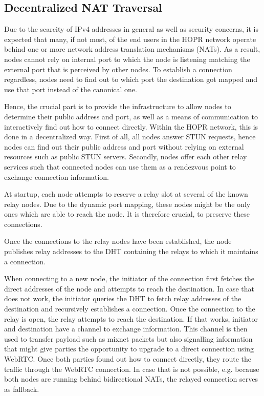 \subsection{Decentralized NAT Traversal}
\label{sec:p2p:nat-traversal}

Due to the scarcity of IPv4 addresses in general as well as security concerns, it is expected that many, if not most, of the end users in the HOPR network operate behind one or more network address translation mechanisms (NATs). As a result, nodes cannot rely on internal port to which the node is listening matching the external port that is perceived by other nodes. To establish a connection regardless, nodes need to find out to which port the destination got mapped and use that port instead of the canonical one.



Hence, the crucial part is to provide the infrastructure to allow nodes to determine their public address and port, as well as a means of communication to interactively find out how to connect directly. Within the HOPR network, this is done in a decentralized way. First of all, all nodes answer STUN requests, hence nodes can find out their public address and port without relying on external resources such as public STUN servers. Secondly, nodes offer each other relay services such that connected nodes can use them as a rendezvous point to exchange connection information.

At startup, each node attempts to reserve a relay slot at several of the known relay nodes. Due to the dynamic port mapping, these nodes might be the only ones which are able to reach the node. It is therefore crucial, to preserve these connections.

Once the connections to the relay nodes have been established, the node publishes relay addresses to the DHT containing the relays to which it maintains a connection.

When connecting to a new node, the initiator of the connection first fetches the direct addresses of the node and attempts to reach the destination. In case that does not work, the initiator queries the DHT to fetch relay addresses of the destination and recursively establishes a connection. Once the connection to the relay is open, the relay attempts to reach the destination. If that works, initiator and destination have a channel to exchange information. This channel is then used to transfer payload such as mixnet packets but also signalling information that might give parties the opportunity to upgrade to a direct connection using WebRTC. Once both parties found out how to connect directly, they route the traffic through the WebRTC connection. In case that is not possible, e.g. because both nodes are running behind bidirectional NATs, the relayed connection serves as fallback.

